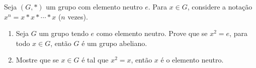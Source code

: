 \documentclass[12pt]{exam}
\begin{document}
\vspace{.3cm}

\questao{} Seja $(G,*)$ um grupo com elemento neutro $e$. Para $x\in
G$, considere a nota{\c c}{\~a}o $x^n=x*x*\cdots *x$ ($n$ vezes).
\begin{enumerate}[label=({\alph*})]
\item Seja $G$ um grupo tendo $e$ como elemento neutro. Prove que se
$x^2=e$, para todo $x\in G$, ent{\~a}o $G$ {\'e} um grupo abeliano.
\item Mostre que se $x\in G$ {\'e} tal que $x^2=x$, ent{\~a}o $x$ {\'e} o elemento neutro.
\end{enumerate}







\end{document}
